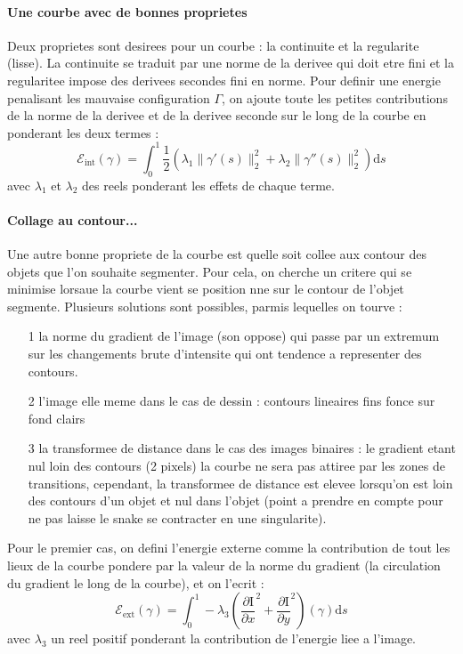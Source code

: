 \documentclass[10pt,a4paper]{article}
\begin{document}
\paragraph{Une courbe avec de bonnes proprietes} Deux proprietes sont desirees pour un courbe : la continuite et la regularite (lisse). La continuite se traduit par une norme de la derivee qui doit etre fini et la regularitee impose des derivees secondes fini en norme. Pour definir une energie penalisant les mauvaise configuration $\Gamma$, on ajoute toute les petites contributions de la norme de la derivee et de la derivee seconde sur le long de la courbe en ponderant les deux termes : 
\begin{displaymath}
	\mathcal{E}_{\text{int}}(\gamma) = \int_{0}^{1} \frac{1}{2} \left(\lambda_1 \|\gamma'(s) \|_{2}^{2} + \lambda_2 \|\gamma''(s) \|_{2}^{2}\right) \mathrm{d}s
\end{displaymath}
avec $\lambda_1$ et $\lambda_2$ des reels ponderant les effets de chaque terme.

\paragraph{Collage au contour...} Une autre bonne propriete de la courbe est quelle soit collee aux contour des objets que l'on souhaite segmenter. Pour cela, on cherche un critere qui se minimise lorsaue la courbe vient se position nne sur le contour de l'objet segmente. Plusieurs solutions sont possibles, parmis lequelles on tourve : 
\begin{itemize}
	\item[1] la norme du gradient de l'image (son oppose) qui passe par un extremum sur les changements brute d'intensite qui ont tendence a representer des contours.
	\item[2] l'image elle meme dans le cas de dessin : contours lineaires fins fonce sur fond clairs
	\item[3] la transformee de distance dans le cas des images binaires : le gradient etant nul loin des contours (2 pixels) la courbe ne sera pas attiree par les zones de transitions, cependant, la transformee de distance est elevee lorsqu'on est loin des contours d'un objet et nul dans l'objet (point a prendre en compte pour ne pas laisse le snake se contracter en une singularite).
\end{itemize}
Pour le premier cas, on defini l'energie externe comme la contribution de tout les lieux de la courbe pondere par la valeur de la norme du gradient (la circulation du gradient le long de la courbe), et on l'ecrit : 
\begin{displaymath}
	\mathcal{E}_{\text{ext}}(\gamma) = \int_{0}^{1} - \lambda_3    \left( \frac{\partial \text{I}}{\partial x}^{2} + \frac{\partial \text{I}}{\partial y} ^{2} \right)(\gamma ) \mathrm{d}s
\end{displaymath}
avec $\lambda_3$ un reel positif ponderant la contribution de l'energie liee a l'image.
\end{document}
